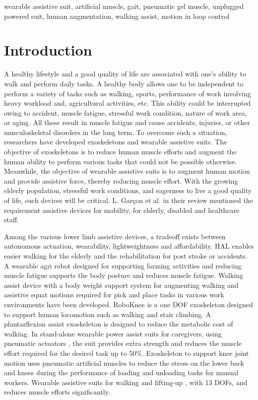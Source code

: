 \documentclass[paper,JRM,paper]{jaciiiarticle}
\begin{document}
\begin{keywords}
wearable assistive suit, artificial muscle, gait, pneumatic gel muscle, unplugged powered suit, human augmentation, walking assist, motion in loop control
\end{keywords}


\section{Introduction}


A healthy lifestyle and a good quality of life are associated with one’s ability to walk and perform daily tasks. A healthy body allows one to be independent to perform a variety of tasks such as walking, sports, performance of work involving heavy workload and, agricultural activities, etc. This ability could be interrupted owing to accident, muscle fatigue, stressful work condition, nature of work area, or aging. All these result in muscle fatigue and cause accidents, injuries, or other musculoskeletal disorders in the long term. To overcome such a situation, researchers have developed exoskeletons and wearable assistive suits. The objective of exoskeletons is to reduce human muscle efforts and augment the human ability to perform various tasks that could not be possible otherwise. Meanwhile, the objective of wearable assistive suits is to augment human motion and provide assistive force, thereby reducing muscle effort. With the growing elderly population, stressful work conditions, and eagerness to live a good quality of life, such devices will be critical. L. Garçon et al. \cite{1} in their review mentioned the requirement assistive devices for mobility, for elderly, disabled and healthcare staff.

Among the various lower limb assistive devices, a tradeoff exists between autonomous actuation, wearability, lightweightness and affordability. HAL \cite{2} enables easier walking for the elderly and the rehabilitation for post stroke or accidents. A wearable agri robot \cite{3} designed for supporting farming activities and reducing muscle fatigue supports the body posture and reduces muscle fatigue. Walking assist device with a body weight support system \cite{4} for augmenting walking and assistive squat motions required for pick and place tasks in various work environments have been developed. RoboKnee \cite{5} is a one DOF exoskeleton designed to support human locomotion such as walking and stair climbing. A plantarflexion assist exoskeleton \cite{6} is designed to reduce the metabolic cost of walking. In stand-alone wearable power assist suits for caregivers, using pneumatic actuators \cite{7}, the suit provides extra strength and reduces the muscle effort required for the desired task up to 50\%. Exoskeleton to support knee joint motion \cite{8} uses pneumatic artificial muscles to reduce the stress on the lower back and knees during the performance of loading and unloading tasks for manual workers. Wearable assistive suits for walking and lifting-up \cite{9}, with 13 DOFs, and reduces muscle efforts significantly. 
\end{document}
